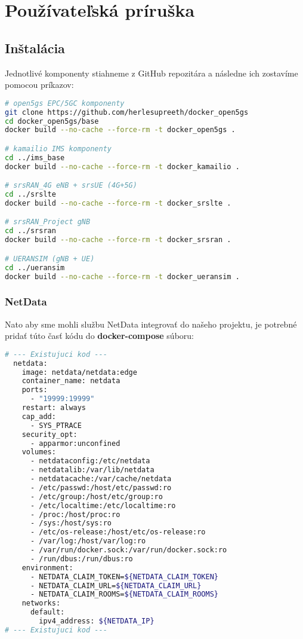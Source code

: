 \setcounter{figure}{0}
\setcounter{listing}{0}

\chapter{Používateľská príruška}
\label{appendix:userguide}
\renewcommand*{\thepage}{A-\arabic{page}}

\begin{refsegment}

\section{Inštalácia}
Jednotlivé komponenty stiahneme z GitHub repozitára a následne ich zostavíme pomocou príkazov:
\begin{lstlisting}[language=bash,caption={Zostavovanie jednotlivých komponentov}, style=bashstyle]
# open5gs EPC/5GC komponenty
git clone https://github.com/herlesupreeth/docker_open5gs
cd docker_open5gs/base
docker build --no-cache --force-rm -t docker_open5gs .

# kamailio IMS komponenty
cd ../ims_base
docker build --no-cache --force-rm -t docker_kamailio .

# srsRAN_4G eNB + srsUE (4G+5G)
cd ../srslte
docker build --no-cache --force-rm -t docker_srslte .

# srsRAN_Project gNB
cd ../srsran
docker build --no-cache --force-rm -t docker_srsran .

# UERANSIM (gNB + UE)
cd ../ueransim
docker build --no-cache --force-rm -t docker_ueransim .
\end{lstlisting}

\subsection{NetData}
Nato aby sme mohli službu NetData integrovať do našeho projektu, je potrebné pridať túto časť kódu do \textbf{docker-compose} súboru:

\begin{lstlisting}[language=bash,caption={Integrácia služby NetData}, style=docker]
# --- Existujuci kod ---
  netdata:
    image: netdata/netdata:edge
    container_name: netdata
    ports:
      - "19999:19999"
    restart: always
    cap_add:
      - SYS_PTRACE
    security_opt:
      - apparmor:unconfined
    volumes:
      - netdataconfig:/etc/netdata
      - netdatalib:/var/lib/netdata
      - netdatacache:/var/cache/netdata
      - /etc/passwd:/host/etc/passwd:ro
      - /etc/group:/host/etc/group:ro
      - /etc/localtime:/etc/localtime:ro
      - /proc:/host/proc:ro
      - /sys:/host/sys:ro
      - /etc/os-release:/host/etc/os-release:ro
      - /var/log:/host/var/log:ro
      - /var/run/docker.sock:/var/run/docker.sock:ro
      - /run/dbus:/run/dbus:ro
    environment:
      - NETDATA_CLAIM_TOKEN=${NETDATA_CLAIM_TOKEN}
      - NETDATA_CLAIM_URL=${NETDATA_CLAIM_URL}
      - NETDATA_CLAIM_ROOMS=${NETDATA_CLAIM_ROOMS}
    networks:
      default:
        ipv4_address: ${NETDATA_IP}
# --- Existujuci kod ---
\end{lstlisting}


\end{refsegment}
